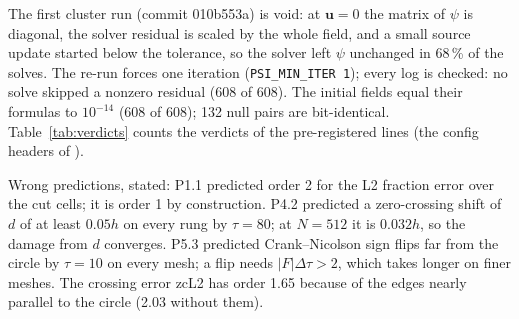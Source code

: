 \documentclass[11pt,a4paper]{article}
\begin{document}
The first cluster run (commit 010b553a) is void: at $\mathbf u=0$ the matrix of $\psi$ is
diagonal, the solver residual is scaled by the whole field, and a small source update started
below the tolerance, so the solver left $\psi$ unchanged in 68\,\% of the solves. The re-run forces
one iteration (\texttt{PSI\_MIN\_ITER 1}); every log is checked: no solve skipped a nonzero
residual (608 of 608). The initial fields equal their formulas to $10^{-14}$ (608 of 608); 132
null pairs are bit-identical. Table~\ref{tab:verdicts} counts the verdicts of the pre-registered
lines (the config headers of ).

Wrong predictions, stated: P1.1 predicted order 2 for the L2 fraction error over the cut cells;
it is order 1 by construction. P4.2 predicted a zero-crossing shift of $d$ of at least $0.05h$ on
every rung by $\tau=80$; at $N=512$ it is $0.032h$, so the damage from $d$ converges. P5.3
predicted Crank--Nicolson sign flips far from the circle by $\tau=10$ on every mesh; a flip needs
$|F|\Delta\tau>2$, which takes longer on finer meshes. The crossing error zcL2 has order 1.65
because of the edges nearly parallel to the circle (2.03 without them).

\begin{table}[h]\centering\small
\caption{Verdicts per pre-registered line (\texttt{staticSource\_verdicts.csv}). UNDEFINED: the metric
needs edges that cross at both times; NOT EVALUATED: outside the line's condition.}
\label{tab:verdicts}

\end{table}

\clearpage


\end{document}
